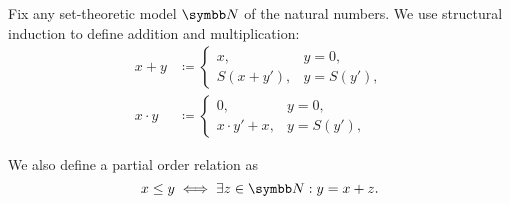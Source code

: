 \begin{definition}\label{def:natural_number_operations}
  Fix any set-theoretic model \( \N \) of the natural numbers. We use structural induction to define addition and multiplication:
  \begin{align*}
    x + y &\coloneqq \begin{cases}
      x, &y = 0, \\
      S(x + y'), &y = S(y'),
    \end{cases}
    \\
    x \cdot y &\coloneqq \begin{cases}
      0, &y = 0, \\
      x \cdot y' + x, &y = S(y'),
    \end{cases}
  \end{align*}

  We also define a partial order relation as
  \begin{equation*}
    x \leq y \iff \exists z \in \N: y = x + z.
  \end{equation*}
\end{definition}

